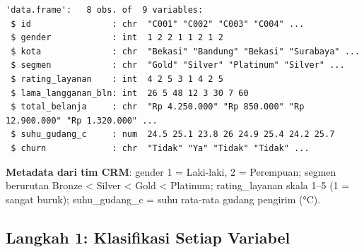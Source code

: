 \documentclass[
  indonesian,
  letterpaper,
]{book}
\begin{document}
\begin{verbatim}
'data.frame':   8 obs. of  9 variables:
 $ id                : chr  "C001" "C002" "C003" "C004" ...
 $ gender            : int  1 2 2 1 1 2 1 2
 $ kota              : chr  "Bekasi" "Bandung" "Bekasi" "Surabaya" ...
 $ segmen            : chr  "Gold" "Silver" "Platinum" "Silver" ...
 $ rating_layanan    : int  4 2 5 3 1 4 2 5
 $ lama_langganan_bln: int  26 5 48 12 3 30 7 60
 $ total_belanja     : chr  "Rp 4.250.000" "Rp 850.000" "Rp 12.900.000" "Rp 1.320.000" ...
 $ suhu_gudang_c     : num  24.5 25.1 23.8 26 24.9 25.4 24.2 25.7
 $ churn             : chr  "Tidak" "Ya" "Tidak" "Tidak" ...
\end{verbatim}

\textbf{Metadata dari tim CRM}: gender 1 = Laki-laki, 2 = Perempuan;
segmen berurutan Bronze \textless{} Silver \textless{} Gold \textless{}
Platinum; rating\_layanan skala 1--5 (1 = sangat buruk); suhu\_gudang\_c
= suhu rata-rata gudang pengirim (°C).

\subsection{Langkah 1: Klasifikasi Setiap
Variabel}\label{langkah-1-klasifikasi-setiap-variabel}
\end{document}
